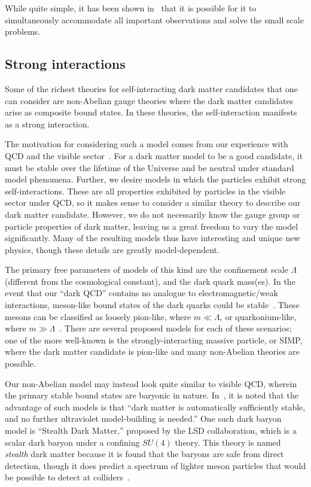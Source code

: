 While quite simple, it has been shown in~\cite{tulin_resonant_2013} that it is
possible for it to simultaneously accommodate all important observations and
solve the small scale problems.

\hypertarget{strong-interactions}{%
\subsection{Strong interactions}\label{strong-interactions}}

Some of the richest theories for self-interacting dark matter candidates that
one can consider are non-Abelian gauge theories where the dark matter
candidates arise as composite bound states. In these theories, the
self-interaction manifests as a strong interaction.

The motivation for considering such a model comes from our experience with QCD
and the visible sector~\cite{kribs_review_2016}. For a dark matter model to be
a good candidate, it must be stable over the lifetime of the Universe and be
neutral under standard model phenomena. Further, we desire models in which the
particles exhibit strong self-interactions. These are all properties exhibited
by particles in the visible sector under QCD, so it makes sense to consider a
similar theory to describe our dark matter candidate. However, we do not
necessarily know the gauge group or particle properties of dark matter,
leaving us a great freedom to vary the model significantly. Many of the
resulting models thus have interesting and unique new physics, though these
details are greatly model-dependent.

The primary free parameters of models of this kind are the confinement scale
\(\Lambda\) (different from the cosmological constant), and the dark quark
mass(es). In the event that our ``dark QCD'' contains no analogue to
electromagnetic/weak interactions, meson-like bound states of the dark quarks
could be stable~\cite{cline_composite_2014}. These mesons can be classified as
loosely pion-like, where \(m \ll \Lambda\), or quarkonium-like, where \(m \gg
\Lambda\)~\cite{kribs_review_2016}. There are several proposed models for each
of these scenarios; one of the more well-known is the strongly-interacting
massive particle, or SIMP, where the dark matter candidate is pion-like and
many non-Abelian theories are possible.

Our non-Abelian model may instead look quite similar to visible QCD, wherein
the primary stable bound states are baryonic in nature.
In~\cite{kribs_review_2016}, it is noted that the advantage of such models is
that ``dark matter is automatically sufficiently stable, and no further
ultraviolet model-building is needed.'' One such dark baryon model is
``Stealth Dark Matter,'' proposed by the LSD collaboration, which is a scalar
dark baryon under a confining \(SU(4)\) theory. This theory is named
\emph{stealth} dark matter because it is found that the baryons are safe from
direct detection, though it does predict a spectrum of lighter meson particles
that would be possible to detect at colliders~\cite{kribs_review_2016}.

